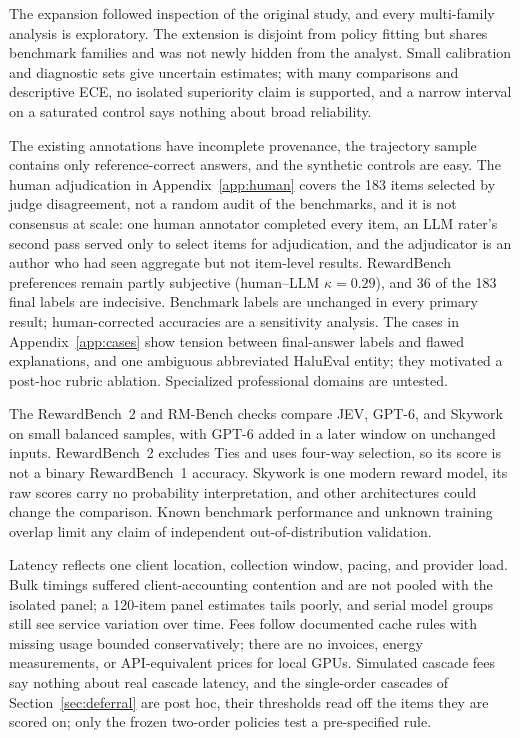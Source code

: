 \documentclass[11pt]{article}
\begin{document}
The expansion followed inspection of the original study, and every multi-family analysis is exploratory. The extension is disjoint from policy fitting but shares benchmark families and was not newly hidden from the analyst. Small calibration and diagnostic sets give uncertain estimates; with many comparisons and descriptive ECE, no isolated superiority claim is supported, and a narrow interval on a saturated control says nothing about broad reliability.

The existing annotations have incomplete provenance, the trajectory sample contains only reference-correct answers, and the synthetic controls are easy. The human adjudication in Appendix~\ref{app:human} covers the 183 items selected by judge disagreement, not a random audit of the benchmarks, and it is not consensus at scale: one human annotator completed every item, an LLM rater's second pass served only to select items for adjudication, and the adjudicator is an author who had seen aggregate but not item-level results. RewardBench preferences remain partly subjective (human--LLM $\kappa=0.29$), and 36 of the 183 final labels are indecisive. Benchmark labels are unchanged in every primary result; human-corrected accuracies are a sensitivity analysis. The cases in Appendix~\ref{app:cases} show tension between final-answer labels and flawed explanations, and one ambiguous abbreviated HaluEval entity; they motivated a post-hoc rubric ablation. Specialized professional domains are untested.

The RewardBench~2 and RM-Bench checks compare JEV, GPT-6, and Skywork on small balanced samples, with GPT-6 added in a later window on unchanged inputs. RewardBench~2 excludes Ties and uses four-way selection, so its score is not a binary RewardBench~1 accuracy. Skywork is one modern reward model, its raw scores carry no probability interpretation, and other architectures could change the comparison. Known benchmark performance and unknown training overlap limit any claim of independent out-of-distribution validation.

Latency reflects one client location, collection window, pacing, and provider load. Bulk timings suffered client-accounting contention and are not pooled with the isolated panel; a 120-item panel estimates tails poorly, and serial model groups still see service variation over time. Fees follow documented cache rules with missing usage bounded conservatively; there are no invoices, energy measurements, or API-equivalent prices for local GPUs. Simulated cascade fees say nothing about real cascade latency, and the single-order cascades of Section~\ref{sec:deferral} are post hoc, their thresholds read off the items they are scored on; only the frozen two-order policies test a pre-specified rule.
\end{document}
